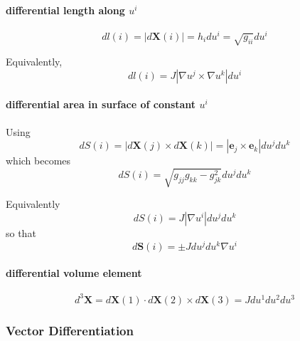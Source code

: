 \paragraph{differential length along $u^{i}$}

\begin{equation}
dl\left( i\right) =\left| d\mathbf{X}\left( i\right) \right| =h_{i}du^{i}=%
\sqrt{ g_{ii}}du^{i}
\end{equation}

Equivalently, 
\begin{equation}
dl\left( i\right) =J\left| \nabla u^{j}\times\nabla u^{k}\right| du^{i}
\end{equation}

\paragraph{differential area in surface of constant $u^{i}$}

Using 
\begin{equation}
dS\left( i\right) =\left| d\mathbf{X}\left( j\right) \times d\mathbf{X}%
\left( k\right) \right| =\left| \mathbf{e}_{j}\times \mathbf{e}_{k}\right|
du^{j}du^{k}
\end{equation}
which becomes 
\begin{equation}
dS\left( i\right) =\sqrt{g_{jj}g_{kk}-g_{jk}^{2}}du^{j}du^{k}
\end{equation}

Equivalently 
\begin{equation}
dS\left( i\right) =J\left| \nabla u^{i}\right| du^{j}du^{k}
\end{equation}
so that 
\begin{equation}
d\mathbf{S}\left( i\right) =\pm Jdu^{j}du^{k}\nabla u^{i}
\end{equation}

\paragraph{differential volume element}

\begin{equation}
d^{3}\mathbf{X=}d\mathbf{X}\left( 1\right) \cdot d\mathbf{X}\left( 2\right)
\times d\mathbf{X}\left( 3\right) =Jdu^{1}du^{2}du^{3}
\end{equation}

\subsubsection{Vector Differentiation}


